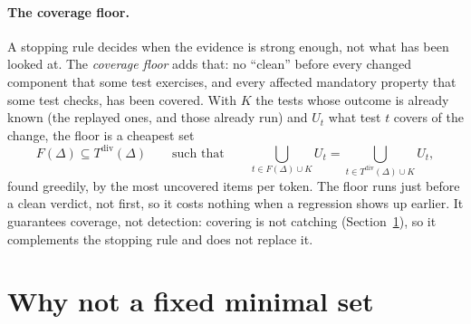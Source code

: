 \documentclass[11pt,a4paper]{article}
\newcommand{\Tdiv}{T^{\mathrm{div}}(\Delta)}
\begin{document}
\paragraph{The coverage floor.} A stopping rule decides when the evidence is strong enough, not what has been
looked at. The \emph{coverage floor} adds that: no ``clean'' before every changed component that some test
exercises, and every affected mandatory property that some test checks, has been covered. With $K$ the tests whose
outcome is already known (the replayed ones, and those already run) and $U_t$ what test $t$ covers of the change,
the floor is a cheapest set
\[
  F(\Delta) \subseteq \Tdiv \qquad \text{such that} \qquad \bigcup_{t \in F(\Delta) \cup K} U_t = \bigcup_{t \in
  \Tdiv \cup K} U_t ,
\]
found greedily, by the most uncovered items per token. The floor runs just before a clean verdict, not first, so it
costs nothing when a regression shows up earlier. It guarantees coverage, not detection: covering is not catching
(Section~\ref{sec:minimal}), so it complements the stopping rule and does not replace it.

\section{Why not a fixed minimal set}
\label{sec:minimal}
\end{document}
